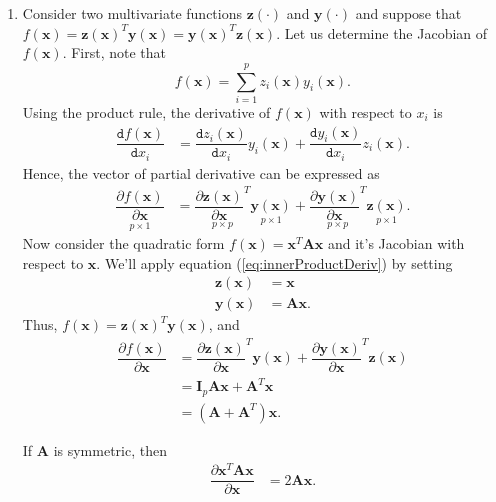 \documentclass[graybox,envcountchap]{svmono}
\newcommand{\xf}{\mathbf{x}}
\newcommand{\yf}{\mathbf{y}}
\newcommand{\zf}{\mathbf{z}}
\newcommand{\tx}{\texttt}
\begin{document}
\begin{enumerate}
\item  Consider two multivariate functions $\zf(\cdot)$ and $\yf(\cdot)$ and suppose that   $f(\xf) = \zf(\xf)^T\yf(\xf) = \yf(\xf)^T\zf(\xf)$.  Let us determine the Jacobian of $f(\xf)$. First, note that  
\begin{equation}
 f(\xf) = \sum_{i=1}^p z_i(\xf)y_i(\xf).
\end{equation}
Using the product rule, the derivative of $f(\xf) $ with respect to $x_i$ is
\begin{equation}
\begin{align}
 \dfrac{\tx{d} f(\xf)}{\tx{d} x_i} &= \dfrac{\tx{d} z_i(\xf)}{\tx{d} x_i}y_i(\xf) + \dfrac{\tx{d} y_i(\xf)}{\tx{d} x_i} z_i(\xf).
\end{align}
\end{equation}
Hence, the vector of partial derivative can be expressed as
\begin{equation}\label{eq:innerProductDeriv}
\begin{align}
\underset{p \times 1}{\dfrac{\partial f (\xf)}{\partial \xf}} &=
 \underset{p \times p}{\dfrac{\partial \zf(\xf)}{\partial \xf}^T} \underset{p \times 1}{\yf(\xf)}
 +\underset{p \times p}{\dfrac{\partial \yf(\xf)} {\partial \xf}^T} \underset{p \times 1}{\zf(\xf)}.
\end{align}
\end{equation}
Now consider the quadratic form $f(\xf) = \xf^T\mathbf{A}\xf$ and it's Jacobian with respect to $\xf$. We'll apply equation (\ref{eq:innerProductDeriv}) by setting
\begin{equation}
 \begin{align}
  \zf(\xf) &= \xf \\
  \yf(\xf) &= \mathbf{A}\xf.
 \end{align}
\end{equation}
Thus, $f(\xf) = \zf(\xf)^T\yf(\xf)$, and
\begin{equation}
\begin{align}\dfrac{\partial f (\xf)}{\partial \xf} &=\dfrac{\partial \zf(\xf)}{\partial \xf}^T \yf(\xf)
 +  \dfrac{\partial \yf(\xf)}{\partial \xf}^T\zf(\xf)\\
 & = \mathbf{I}_p \mathbf{A} \xf + \mathbf{A}^T\xf \\
 & = \left(\mathbf{A}  + \mathbf{A}^T \right) \xf.
\end{align}
\end{equation}

If $\mathbf{A}$ is symmetric, then 
\begin{equation}
\begin{align}
  \dfrac{\partial \xf^T\mathbf{A}\xf}{\partial \xf}  & = 2\mathbf{A}  \xf.\\
\end{align}
\end{equation}


\end{enumerate}
\end{document}
